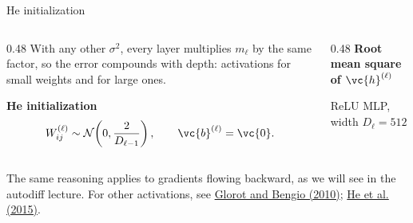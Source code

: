 \begin{frame}{He initialization}
	\MLPTrainingFont
	\setlength{\abovedisplayskip}{4pt}\setlength{\belowdisplayskip}{4pt}
	\begin{columns}[c,onlytextwidth]
		\begin{column}{0.48\textwidth}
			With any other $\sigma^2$, every layer multiplies $m_\ell$ by the same factor, so the error compounds with depth: activations  for small weights and  for large ones.

			\medskip

			\begin{tcolorbox}[nndsblue,boxsep=1mm,top=1mm,bottom=1mm]
				\textbf{\color{darkcerulean}He initialization}
				\[
					W^{(\ell)}_{ij}\sim\mathcal{N}\!\left(0,\frac{2}{D_{\ell-1}}\right),
					\qquad \vc{b}^{(\ell)}=\vc{0}.
				\]
			\end{tcolorbox}
		\end{column}
		\begin{column}{0.48\textwidth}
			\centering
			\textbf{\color{darkcerulean}Root mean square of $\vc{h}^{(\ell)}$}\par
			{\scriptsize\color{drawgray}ReLU MLP, width $D_\ell=512$}\par
			\medskip
			
		\end{column}
	\end{columns}
	\vfill
	{\scriptsize\color{drawgray}The same reasoning applies to gradients flowing backward, as we will see in the autodiff lecture. For other activations, see \href{https://proceedings.mlr.press/v9/glorot10a.html}{Glorot and Bengio (2010)}; \href{https://arxiv.org/abs/1502.01852}{He et al. (2015)}.\par}
\end{frame}
